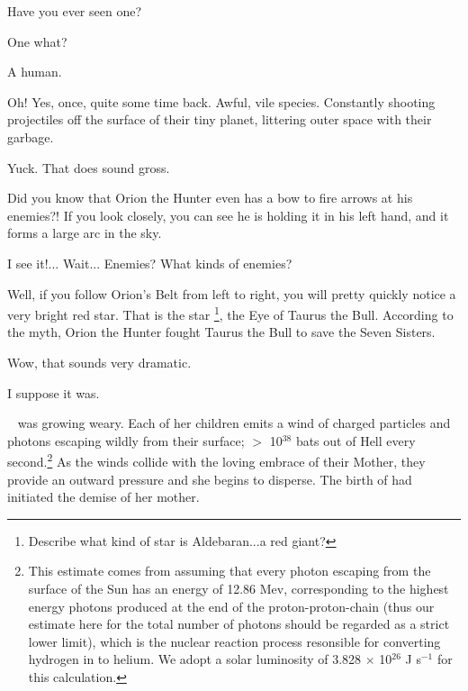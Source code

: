 \documentclass[main.tex]{subfiles}
\begin{document}
\par \Maia Have you ever seen one?

\par \Pleione One what?

\par \Maia A human.

\par \Pleione Oh!  Yes, once, quite some time back.  Awful, vile species.  Constantly shooting projectiles off the surface of their tiny planet, littering outer space with their garbage.

\par \Maia Yuck.  That does sound gross.  

\par \Pleione Did you know that Orion the Hunter even has a bow to fire arrows at his enemies?!  If you look closely, you can see he is holding it in his left hand, and it forms a large arc in the sky.

\par \Maia I see it!... Wait... Enemies?  What kinds of enemies?

\par \Pleione Well, if you follow Orion's Belt from left to right, you will pretty quickly notice a very bright red star.  That is the star \rmaldebarran\footnote{Describe what kind of star is Aldebaran...a red giant?}, the Eye of Taurus the Bull.  According to the myth, Orion the Hunter fought Taurus the Bull to save the Seven Sisters.  

\par \Maia Wow, that sounds very dramatic.

\par \Pleione I suppose it was.

\par \nar \rmpleione~ was growing weary.  Each of her children emits a wind of charged particles and photons escaping wildly from their surface; $>$ 10$^{38}$ bats out of Hell every second.\footnote{This estimate comes from assuming that every photon escaping from the surface of the Sun has an energy of 12.86 Mev, corresponding to the highest energy photons produced at the end of the proton-proton-chain (thus our estimate here for the total number of photons should be regarded as a strict lower limit), which is the nuclear reaction process resonsible for converting hydrogen in to helium.  We adopt a solar luminosity of 3.828 ${\times}$ 10$^{26}$ J s$^{-1}$ for this calculation.}  As the winds collide with the loving embrace of their Mother, they provide an outward pressure and she begins to disperse.  The birth of \rmmaia had initiated the demise of her mother.  
\end{document}
